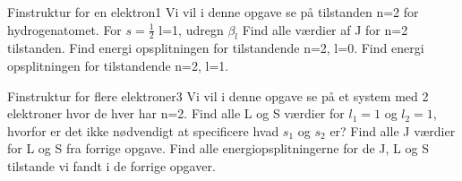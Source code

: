 \documentclass[../../Atom-ogMolekylefysik.tex]{subfiles}
\begin{document}
\begin{opgave}{Finstruktur for en elektron}{1}
Vi vil i denne opgave se på tilstanden n=2 for hydrogenatomet.
\opg For $s=\frac{1}{2}$ l=1, udregn $\beta_l$
\opg Find alle værdier af J for n=2 tilstanden.
\opg Find energi opsplitningen for tilstandende n=2, l=0.
\opg Find energi opsplitningen for tilstandende n=2, l=1.
\end{opgave}

\begin{opgave}{Finstruktur for flere elektroner}{3}
Vi vil i denne opgave se på et system med 2 elektroner hvor de hver har n=2.
\opg Find alle L og S værdier for $l_1=1$ og $l_2=1$, hvorfor er det ikke nødvendigt at specificere hvad $s_1$ og $s_2$ er?
\opg Find alle J værdier for L og S fra forrige opgave.
\opg Find alle energiopsplitningerne for de J, L og S tilstande vi fandt i de forrige opgaver. 
\end{opgave}
\end{document}
